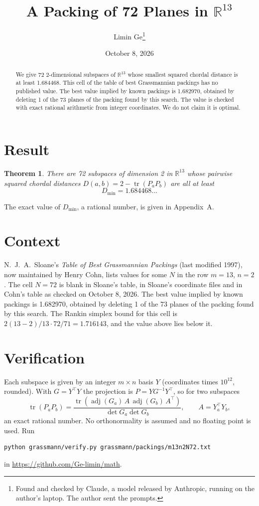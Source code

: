 \documentclass[11pt,a4paper]{article}
\title{A Packing of 72 Planes in $\mathbb{R}^{13}$}
\author{Limin Ge\thanks{Found and checked by Claude, a model released by Anthropic, running on the author's laptop. The author sent the prompts.}}
\date{October 8, 2026}
\newtheorem*{theorem}{Theorem}
\begin{document}
\maketitle
\begin{abstract}
We give 72 2-dimensional subspaces of $\mathbb{R}^{13}$ whose smallest squared chordal distance is at least 1.684468. This cell of the table of best Grassmannian packings has no published value. The best value implied by known packings is 1.682970, obtained by deleting 1 of the 73 planes of the packing found by this search. The value is checked with exact rational arithmetic from integer coordinates. We do not claim it is optimal.
\end{abstract}

\section{Result}
\begin{theorem}
There are 72 subspaces of dimension 2 in $\mathbb{R}^{13}$ whose pairwise squared chordal distances $D(a,b) = 2 - \operatorname{tr}(P_aP_b)$ are all at least
\[ D_{\min} = 1.684468\ldots \]
\end{theorem}
The exact value of $D_{\min}$, a rational number, is given in Appendix~A.


\section{Context}
N.~J.~A.~Sloane's \emph{Table of Best Grassmannian Packings} (last modified 1997), now maintained by Henry Cohn, lists values for some $N$ in the row $m=13$, $n=2$. The cell $N=72$ is blank in Sloane's table, in Sloane's coordinate files and in Cohn's table as checked on October 8, 2026. The best value implied by known packings is 1.682970, obtained by deleting 1 of the 73 planes of the packing found by this search. The Rankin simplex bound for this cell is $2(13-2)/13\cdot 72/71 = 1.716143$, and the value above lies below it.


\section{Verification}
Each subspace is given by an integer $m\times n$ basis $Y$ (coordinates times $10^{12}$, rounded). With $G=Y^\top Y$ the projection is $P=YG^{-1}Y^\top$, so for two subspaces
\[ \operatorname{tr}(P_aP_b)=\frac{\operatorname{tr}(\operatorname{adj}(G_a)\,A\,\operatorname{adj}(G_b)\,A^\top)}{\det G_a\det G_b},\qquad A=Y_a^\top Y_b, \]
an exact rational number. No orthonormality is assumed and no floating point is used. Run
\begin{verbatim}
python grassmann/verify.py grassmann/packings/m13n2N72.txt
\end{verbatim}
in \url{https://github.com/Ge-limin/math}.
\end{document}
